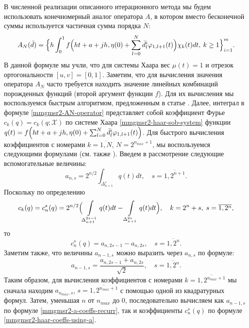 В численной реализации описанного итерационного метода мы будем использовать конечномерный аналог оператора $A$, в котором вместо бесконечной суммы используется частичная сумма порядка $N$:
\begin{equation}\label{mmgmsr2-AN-operator}
A_N(\bar{d})=
\Bigl\{
h\int_{0}^{1}f\Bigl(ht + a + jh,\eta(0)+ \sum_{l=0}^N \bar{d}^i_l \varphi_{1,l+1}(t)\Bigr)\chi_{k}(t)dt,
\: k \ge 1
\Bigr\}_{i=1}^m.
\end{equation}
В данной формуле мы учли, что для системы Хаара вес $\mu(t)=1$ и отрезок ортогональности $[u,v]=[0,1]$. Заметим, что для вычисления значения оператора $A_N$ часто требуется находить значение линейных комбинаций порожденных функций (второй аргумент функции $f$). Для их вычисления мы воспользуемся быстрым алгоритмом, предложенным в статье \cite{mmgmsr2-bib-haar-fast-calc}. Далее, интеграл в формуле \eqref{mmgmsr2-AN-operator} представляет собой коэффициент Фурье $c_k(q)=c_k(q; \mathcal{X})$ по системе Хаара \eqref{mmgmsr2-haar-sob-system} функции $q(t)=f\Bigl(ht + a + jh,\eta(0)+ \sum_{l=0}^N \bar{d}^i_l \varphi_{1,l+1}(t)\Bigr)$. Для быстрого вычисления коэффициентов с номерами $k=\overline{1,N}$, $N=2^{n_{max}+1}$, мы воспользуемся следующими формулами (см. также \cite[c. 47]{mmgmsr2-bib-farcov}). Введем в рассмотрение следующие вспомогательные величины:
\begin{equation}\label{mmgmsr2-a-coeffs}
a_{n,s} = 2^{n/2} \int_{\Delta^s_{n+1}} q(t)dt, \quad s = \overline{1,2^{n+1}}.
\end{equation}
Поскольку по определению
\begin{equation*}
c_k(q)=c_n^s(q)=2^{n/2}\Bigl(
\int\limits_{\Delta_{n+1}^{2s-1}}q(t)dt-
\int\limits_{\Delta_{n+1}^{2s}}q(t)dt
\Bigr), \quad k=2^n+s, \; s=\overline{1,2^n},
\end{equation*}
то 
\begin{equation}\label{mmgmsr2-haar-coeffs-using-a}
c_n^s(q)=a_{n,2s-1}-a_{n,2s}, 
\quad s = \overline{1,2^{n}}.
\end{equation}
Заметим также, что величины $a_{n-1,s}$ можно выразить через $a_{n,s}$ по формуле:
\begin{equation}\label{mmgmsr2-a-coeffs-recurr}
a_{n-1,s}=\frac{a_{n,2s-1}+a_{n,2s}}{\sqrt{2}},
\quad s = \overline{1,2^{n}}.
\end{equation}
Таким образом, для вычисления коэффициентов с номерами $k=\overline{1,2^{n_{max}+1}}$ мы сначала находим $a_{n_{max},s}$, $s=\overline{1,2^{n_{max}+1}}$ с помощью одной из квадратурных формул. Затем, уменьшая $n$ от $n_{max}$ до $0$, последовательно вычисляем как $a_{n-1,s}$ по формуле \eqref{mmgmsr2-a-coeffs-recurr}, так и коэффициенты $c_n^s(q)$ по формуле \eqref{mmgmsr2-haar-coeffs-using-a}. 

